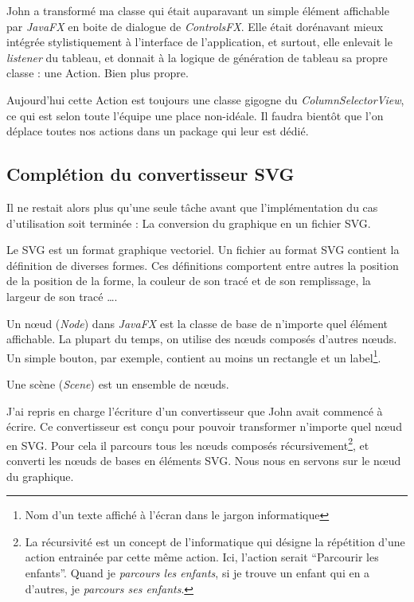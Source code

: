 John a transformé ma classe qui était auparavant un simple élément affichable par \textit{JavaFX} en boite de dialogue de \textit{ControlsFX}. Elle était dorénavant mieux intégrée stylistiquement à l'interface de l'application, et surtout, elle enlevait le \textit{listener} du tableau, et donnait à la logique de génération de tableau sa propre classe : une Action. Bien plus propre.

Aujourd'hui cette Action est toujours une classe gigogne du \textit{ColumnSelectorView}, ce qui est selon toute l'équipe une place non-idéale. Il faudra bientôt que l'on déplace toutes nos actions dans un package qui leur est dédié.

%
%
\subsection{Complétion du convertisseur SVG}
Il ne restait alors plus qu'une seule tâche avant que l'implémentation du cas d'utilisation soit terminée : La conversion du graphique en un fichier SVG.

\begin{center}
Le SVG est un format graphique vectoriel. Un fichier au format SVG contient la définition de diverses formes. Ces définitions comportent entre autres la position de la position de la forme, la couleur de son tracé et de son remplissage, la largeur de son tracé \ldots.
\end{center}

\begin{center}
Un nœud (\textit{Node}) dans \textit{JavaFX} est la classe de base de n'importe quel élément affichable. La plupart du temps, on utilise des nœuds composés d'autres nœuds. Un simple bouton, par exemple, contient au moins un rectangle et un label\footnote{Nom d'un texte affiché à l'écran dans le jargon informatique}.
\end{center}

\begin{center}
Une scène (\textit{Scene}) est un ensemble de nœuds.
\end{center}

J'ai repris en charge l'écriture d'un convertisseur que John avait commencé à écrire. Ce convertisseur est conçu pour pouvoir transformer n'importe quel nœud en SVG. Pour cela il parcours tous les nœuds composés récursivement\footnote{La récursivité est un concept de l'informatique qui désigne la répétition d'une action entrainée par cette même action. Ici, l'action serait ``Parcourir les enfants''. Quand je \emph{parcours les enfants}, si je trouve un enfant qui en a d'autres, je \emph{parcours ses enfants}.}, et converti les nœuds de bases en éléments SVG. Nous nous en servons sur le nœud du graphique.


